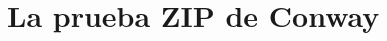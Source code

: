 \documentclass[10pt]{report}
\theoremstyle{definition}
\newcommand\blankpage{%
    \null
    \thispagestyle{empty}%
    \newpage}
\begin{document}
\afterpage{\blankpage}

\chapter{La prueba ZIP de Conway}
\end{document}
